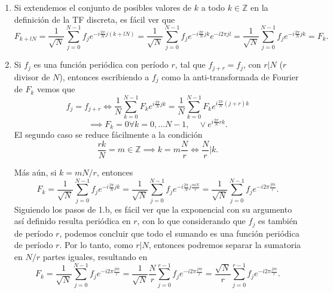 \documentclass{scrartcl}
\newcommand{\inv}[1]{\frac{1}{#1}}
\DeclareRobustCommand{\[}{\begin{equation}}
\DeclareRobustCommand{\]}{\end{equation}}
\begin{document}
\begin{enumerate}
\begin{enumerate}
        
        \item Si extendemos el conjunto de posibles valores de $k$ a todo $k \in \mathds{Z}$ en la definición de la TF discreta, es fácil ver que
        \[ F_{k + lN} = \inv{\sqrt{N}} \sum_{j = 0}^{N-1} f_j e^{-i\frac{2\pi}{N} j (k + lN)} = \inv{\sqrt{N}} \sum_{j = 0}^{N-1} f_j e^{-i\frac{2\pi}{N} jk} e^{-i2\pi jl} = \inv{\sqrt{N}} \sum_{j = 0}^{N-1} f_j e^{-i\frac{2\pi}{N} jk} = F_k. \]
        
        
        \item Si $f_j$ es una función periódica con período $r$, tal que $f_{j + r} = f_{j}$, con $r | N$ ($r$ divisor de $N$), entonces escribiendo a $f_j$ como la anti-transformada de Fourier de $F_k$ vemos que
        \[ f_{j} = f_{j + r} \iff \inv{N} \sum_{k = 0}^{N - 1} F_k e^{i \frac{2\pi}{N} jk} = \inv{N} \sum_{k = 0}^{N - 1} F_k e^{i \frac{2\pi}{N} (j + r) k} \]
        \[ \implies F_k = 0 \forall k = 0, \dots N-1, \quad \vee e^{i \frac{2\pi}{N} rk}. \]
        El segundo caso se reduce fácilmente a la condición
        \[ \frac{rk}{N} = m \in \mathds{Z} \implies k = m \frac{N}{r} \iff \frac{N}{r} | k. \]
        
        Más aún, si $k = m N/r$, entonces
        \[ F_k = \inv{\sqrt{N}} \sum_{j = 0}^{N - 1} f_j e^{-i \frac{2\pi}{N} jk} = \inv{\sqrt{N}} \sum_{j = 0}^{N - 1} f_j e^{-i \frac{2\pi}{N} j \frac{mN}{r}} = \inv{\sqrt{N}} \sum_{j = 0}^{N - 1} f_j e^{-i 2\pi \frac{jm}{r}}. \]
        Siguiendo los pasos de 1.b, es fácil ver que la exponencial con su argumento así definido resulta periódica en $r$, con lo que considerando que $f_j$ es también de período $r$, podemos concluir que todo el sumando es una función periódica de período $r$. Por lo tanto, como $r | N$, entonces podremos separar la sumatoria en $N/r$ partes iguales, resultando en
        \[ F_k = \inv{\sqrt{N}} \sum_{j = 0}^{N - 1} f_j e^{-i 2\pi \frac{jm}{r}} = \inv{\sqrt{N}} \frac{N}{r} \sum_{j = 0}^{r - 1} f_j e^{-i 2\pi \frac{jm}{r}} = \frac{\sqrt{N}}{r} \sum_{j = 0}^{r - 1} f_j e^{-i 2\pi \frac{jm}{r}}. \]
        
    \end{enumerate}
    
    
    

\end{enumerate}
\end{document}
